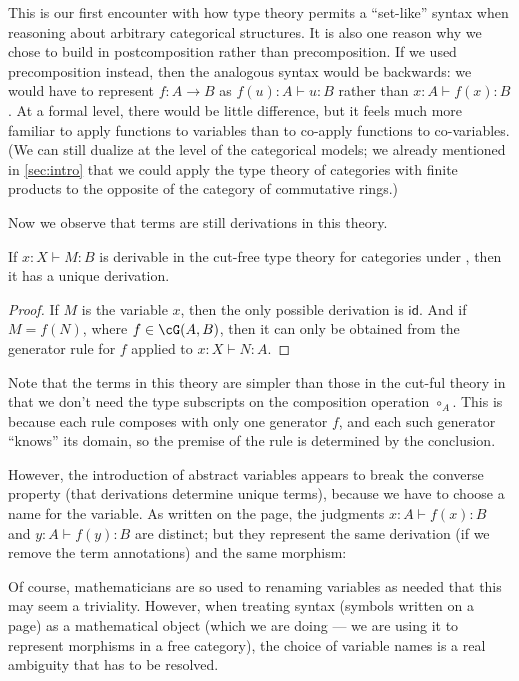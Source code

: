 \documentclass{book}
\def\idfunc{\mathsf{id}}
\let\types\vdash
\def\comp#1{\circ_{#1}}
\begin{document}
This is our first encounter with how type theory permits a ``set-like'' syntax when reasoning about arbitrary categorical structures.
It is also one reason why we chose to build in postcomposition rather than precomposition.
If we used precomposition instead, then the analogous syntax would be backwards: we would have to represent $f:A\to B$ as $f(u):A \types u:B$ rather than $x:A \types f(x):B$.
At a formal level, there would be little difference, but it feels much more familiar to apply functions to variables than to co-apply functions to co-variables.
(We can still dualize at the level of the categorical models; we already mentioned in \cref{sec:intro} that we could apply the type theory of categories with finite products to the opposite of the category of commutative rings.)

Now we observe that terms are still derivations in this theory.

\begin{lem}\label{thm:category-tad}
  If $x:X \types M:B$ is derivable in the cut-free type theory for categories under \cG, then it has a unique derivation.
\end{lem}
\begin{proof}
  If $M$ is the variable $x$, then the only possible derivation is $\idfunc$.
  And if $M = f(N)$, where $f\in\cG(A,B)$, then it can only be obtained from the generator rule for $f$ applied to $x:X \types N:A$.
\end{proof}

Note that the terms in this theory are simpler than those in the cut-ful theory in that we don't need the type subscripts on the composition operation $\comp{A}$.
This is because each rule composes with only one generator $f$, and each such generator ``knows'' its domain, so the premise of the rule is determined by the conclusion.

However, the introduction of abstract variables appears to break the converse property (that derivations determine unique terms), because we have to choose a name for the variable.
As written on the page, the judgments $x:A \types f(x):B$ and $y:A \types f(y):B$ are distinct; but they represent the same derivation (if we remove the term annotations) and the same morphism:
Of course, mathematicians are so used to renaming variables as needed that this may seem a triviality.
However, when treating syntax (symbols written on a page) as a mathematical object (which we are doing --- we are using it to represent morphisms in a free category), the choice of variable names is a real ambiguity that has to be resolved.
\end{document}
